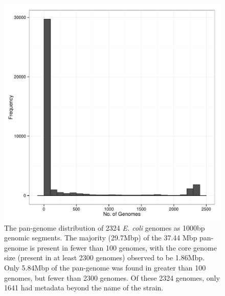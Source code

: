 \documentclass[doublespacing, linenumbers]{bmcart}
\begin{document}
\begin{backmatter}
\newpage
\begin{figure}[h!]
  \includegraphics[width=1\columnwidth]{images/panGenomeSize.pdf}
  \caption{The pan-genome distribution of 2324 \textit{E. coli} genomes as 1000bp genomic segments. The majority (29.7Mbp) of the 37.44 Mbp pan-genome is present in fewer than 100 genomes, with the core genome size (present in at least 2300 genomes) observed to be 1.86Mbp. Only 5.84Mbp of the pan-genome was found in greater than 100 genomes, but fewer than 2300 genomes. Of these 2324 genomes, only 1641 had metadata beyond the name of the strain. }
  \label{fig:pan_genome_size}
\end{figure}



\end{backmatter}
\end{document}

